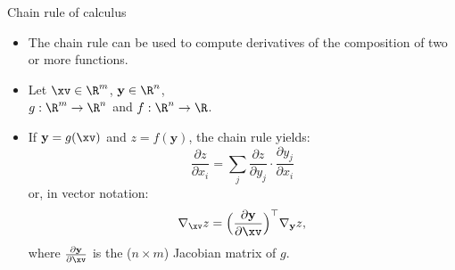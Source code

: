 \begin{vbframe}{Chain rule of calculus}
  \begin{itemize}
    \item The chain rule can be used to compute derivatives of the composition of two or more functions.
    \item Let $\xv \in \R^m$, $\mathbf{y} \in \R^n$, \\
          $g: \R^m \to \R^n$ and $f: \R^n \to \R$. \\
    \item If $\mathbf{y} = g(\xv)$ and $z = f(\mathbf{y})$, the chain rule yields: $$\frac{\partial z}{\partial x_i} = \sum_j \frac{\partial z}{\partial y_j} \cdot \frac{\partial y_j}{\partial x_i}$$
          or, in vector notation: $$\nabla_{\xv} z = \Big(\frac{\partial \mathbf{y}}{\partial \xv}\Big)^\top \nabla_{\mathbf{y}} z,$$
          where $\frac{\partial \mathbf{y}}{\partial \xv}$ is the ($n \times m$) Jacobian matrix of $g$.
  \end{itemize}
\end{vbframe}  

